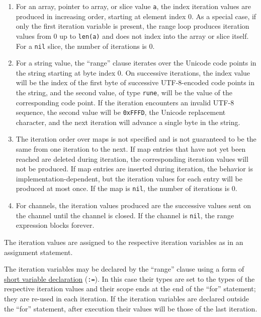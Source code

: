 {\begin{enumerate}
\item
  For an array, pointer to array, or slice value \texttt{a}, the index
  iteration values are produced in increasing order, starting at element
  index 0. As a special case, if only the first iteration variable is
  present, the range loop produces iteration values from 0 up to
  \texttt{len(a)} and does not index into the array or slice itself. For
  a \texttt{nil} slice, the number of iterations is 0.
\item
  For a string value, the ``range'' clause iterates over the Unicode
  code points in the string starting at byte index 0. On successive
  iterations, the index value will be the index of the first byte of
  successive UTF-8-encoded code points in the string, and the second
  value, of type \texttt{rune}, will be the value of the corresponding
  code point. If the iteration encounters an invalid UTF-8 sequence, the
  second value will be \texttt{0xFFFD}, the Unicode replacement
  character, and the next iteration will advance a single byte in the
  string.
\item
  The iteration order over maps is not specified and is not guaranteed
  to be the same from one iteration to the next. If map entries that
  have not yet been reached are deleted during iteration, the
  corresponding iteration values will not be produced. If map entries
  are inserted during iteration, the behavior is
  implementation-dependent, but the iteration values for each entry will
  be produced at most once. If the map is \texttt{nil}, the number of
  iterations is 0.
\item
  For channels, the iteration values produced are the successive values
  sent on the channel until the channel is closed. If
  the channel is \texttt{nil}, the range expression blocks forever.
\end{enumerate}

The iteration values are assigned to the respective iteration variables
as in an assignment statement.

The iteration variables may be declared by the ``range'' clause using a
form of \hyperref[Short\_variable\_declarations]{short variable
declaration} (\texttt{:=}). In this case their types are set to the
types of the respective iteration values and their
scope ends at the end of the
``for'' statement; they are re-used in each iteration. If the iteration
variables are declared outside the ``for'' statement, after execution
their values will be those of the last iteration.

}
